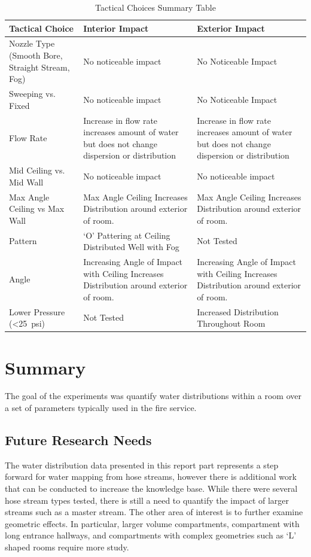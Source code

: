\documentclass[12pt,oneside]{book}
\begin{document}
\begin{table}[!ht]
\centering
\caption{Tactical Choices Summary Table}
\label{tab:tac_choice}
\begin{tabular}{L{5cm}L{5cm}L{5cm}}
\toprule[1.5pt]
Tactical Choice & Interior Impact & Exterior Impact \\
\midrule
Nozzle Type (Smooth Bore, Straight Stream, Fog) & No noticeable impact & No Noticeable Impact \\[.5cm]
Sweeping vs. Fixed & No noticeable impact & No Noticeable Impact \\[.5cm]
Flow Rate & Increase in flow rate increases amount of water but does not change dispersion or distribution & Increase in flow rate increases amount of water but does not change dispersion or distribution \\ [.5cm]
Mid Ceiling vs. Mid Wall & No noticeable impact & No noticeable impact \\ [.5cm]
Max Angle Ceiling vs Max Wall & Max Angle Ceiling Increases Distribution around exterior of room.  & Max Angle Ceiling Increases Distribution around exterior of room. \\ [.5cm]
Pattern & `O' Pattering at Ceiling Distributed Well with Fog & Not Tested \\ [.5cm]
Angle & Increasing Angle of Impact with Ceiling Increases Distribution around exterior of room. & Increasing Angle of Impact with Ceiling Increases Distribution around exterior of room. \\ [.5cm]
Lower Pressure (<25~psi) & Not Tested & Increased Distribution Throughout Room \\
\bottomrule[1.25pt]
\end{tabular}
\end{table}

\chapter{Summary}

The goal of the experiments was quantify water distributions within a room over a set of parameters typically used in the fire service. 

\section{Future Research Needs}
The water distribution data presented in this report part represents a step forward for water mapping from hose streams, however there is additional work that can be conducted to increase the knowledge base. While there were several hose stream types tested, there is still a need to quantify the impact of larger streams such as a master stream. The other area of interest is to further examine geometric effects. In particular, larger volume compartments, compartment with long entrance hallways, and compartments with complex geometries such as `L' shaped rooms require more study.
\end{document}
